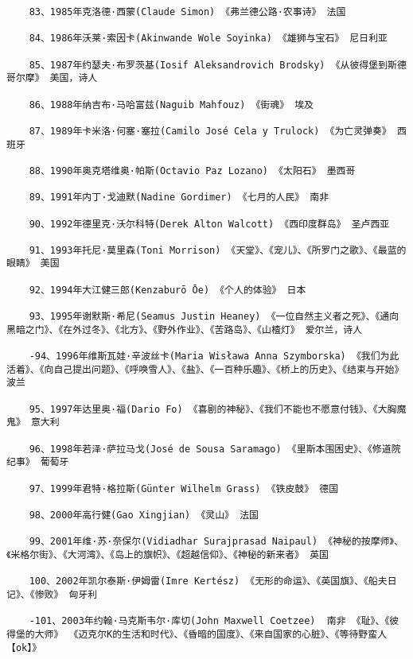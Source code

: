 \documentclass[UTF8]{../../RepresentationUniverse}
\begin{document}
\begin{lstlisting}
    83、1985年克洛德·西蒙(Claude Simon) 《弗兰德公路·农事诗》 法国
    
    84、1986年沃莱·索因卡(Akinwande Wole Soyinka) 《雄狮与宝石》 尼日利亚
    
    85、1987年约瑟夫·布罗茨基(Iosif Aleksandrovich Brodsky) 《从彼得堡到斯德哥尔摩》 美国，诗人
    
    86、1988年纳吉布·马哈富兹(Naguib Mahfouz) 《街魂》 埃及
    
    87、1989年卡米洛·何塞·塞拉(Camilo José Cela y Trulock) 《为亡灵弹奏》 西班牙
    
    88、1990年奥克塔维奥·帕斯(Octavio Paz Lozano) 《太阳石》 墨西哥
    
    89、1991年内丁·戈迪默(Nadine Gordimer) 《七月的人民》 南非
    
    90、1992年德里克·沃尔科特(Derek Alton Walcott) 《西印度群岛》 圣卢西亚
    
    91、1993年托尼·莫里森(Toni Morrison) 《天堂》、《宠儿》、《所罗门之歌》、《最蓝的眼睛》 美国
    
    92、1994年大江健三郎(Kenzaburō Ōe) 《个人的体验》 日本
    
    93、1995年谢默斯·希尼(Seamus Justin Heaney) 《一位自然主义者之死》、《通向黑暗之门》、《在外过冬》、《北方》、《野外作业》、《苦路岛》、《山楂灯》 爱尔兰，诗人
    
    -94、1996年维斯瓦娃·辛波丝卡(Maria Wisława Anna Szymborska) 《我们为此活着》、《向自己提出问题》、《呼唤雪人》、《盐》、《一百种乐趣》、《桥上的历史》、《结束与开始》 波兰
    
    95、1997年达里奥·福(Dario Fo) 《喜剧的神秘》、《我们不能也不愿意付钱》、《大胸魔鬼》 意大利
    
    96、1998年若泽·萨拉马戈(José de Sousa Saramago) 《里斯本围困史》、《修道院纪事》 葡萄牙
    
    97、1999年君特·格拉斯(Günter Wilhelm Grass) 《铁皮鼓》 德国
    
    98、2000年高行健(Gao Xingjian) 《灵山》 法国
    
    99、2001年维·苏·奈保尔(Vidiadhar Surajprasad Naipaul) 《神秘的按摩师》、《米格尔街》、《大河湾》、《岛上的旗帜》、《超越信仰》、《神秘的新来者》 英国
    
    100、2002年凯尔泰斯·伊姆雷(Imre Kertész) 《无形的命运》、《英国旗》、《船夫日记》、《惨败》 匈牙利
    
    -101、2003年约翰·马克斯韦尔·库切(John Maxwell Coetzee)  南非 《耻》、《彼得堡的大师》 《迈克尔K的生活和时代》、《昏暗的国度》、《来自国家的心脏》、《等待野蛮人【ok】》
    

\end{lstlisting}
\end{document}
